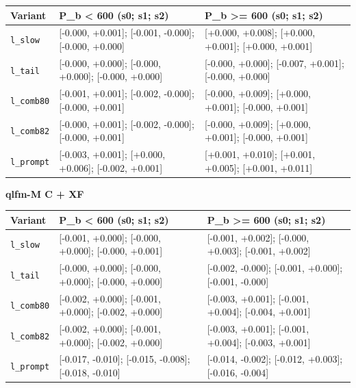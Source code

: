 \documentclass[10pt,a4paper]{article}
\begin{document}
\begin{center}\small
\setlength{\tabcolsep}{3pt}\renewcommand{\arraystretch}{1.15}
\begin{tabularx}{\linewidth}{LLL}
\toprule
\textbf{Variant} & \textbf{P\_b < 600 (s0; s1; s2)} & \textbf{P\_b >= 600 (s0; s1; s2)} \\
\midrule
\texttt{l\_\allowbreak{}slow} & [-0.000, +0.001]; [-0.001, -0.000]; [-0.000, +0.000] & [+0.000, +0.008]; [+0.000, +0.001]; [+0.000, +0.001] \\
\texttt{l\_\allowbreak{}tail} & [-0.000, +0.000]; [-0.000, +0.000]; [-0.000, +0.000] & [-0.000, +0.000]; [-0.007, +0.001]; [-0.000, +0.000] \\
\texttt{l\_\allowbreak{}comb80} & [-0.001, +0.001]; [-0.002, -0.000]; [-0.000, +0.001] & [-0.000, +0.009]; [+0.000, +0.001]; [-0.000, +0.001] \\
\texttt{l\_\allowbreak{}comb82} & [-0.000, +0.001]; [-0.002, -0.000]; [-0.000, +0.001] & [-0.000, +0.009]; [+0.000, +0.001]; [-0.000, +0.001] \\
\texttt{l\_\allowbreak{}prompt} & [-0.003, +0.001]; [+0.000, +0.006]; [-0.002, +0.001] & [+0.001, +0.010]; [+0.001, +0.005]; [+0.001, +0.011] \\
\bottomrule
\end{tabularx}
\end{center}
\textbf{qlfm-M C + XF}

\begin{center}\small
\setlength{\tabcolsep}{3pt}\renewcommand{\arraystretch}{1.15}
\begin{tabularx}{\linewidth}{LLL}
\toprule
\textbf{Variant} & \textbf{P\_b < 600 (s0; s1; s2)} & \textbf{P\_b >= 600 (s0; s1; s2)} \\
\midrule
\texttt{l\_\allowbreak{}slow} & [-0.001, +0.000]; [-0.000, +0.000]; [-0.000, +0.001] & [-0.001, +0.002]; [-0.000, +0.003]; [-0.001, +0.002] \\
\texttt{l\_\allowbreak{}tail} & [-0.000, +0.000]; [-0.000, +0.000]; [-0.000, +0.000] & [-0.002, -0.000]; [-0.001, +0.000]; [-0.001, -0.000] \\
\texttt{l\_\allowbreak{}comb80} & [-0.002, +0.000]; [-0.001, +0.000]; [-0.002, +0.000] & [-0.003, +0.001]; [-0.001, +0.004]; [-0.004, +0.001] \\
\texttt{l\_\allowbreak{}comb82} & [-0.002, +0.000]; [-0.001, +0.000]; [-0.002, +0.000] & [-0.003, +0.001]; [-0.001, +0.004]; [-0.003, +0.001] \\
\texttt{l\_\allowbreak{}prompt} & [-0.017, -0.010]; [-0.015, -0.008]; [-0.018, -0.010] & [-0.014, -0.002]; [-0.012, +0.003]; [-0.016, -0.004] \\
\bottomrule
\end{tabularx}
\end{center}
\end{document}
